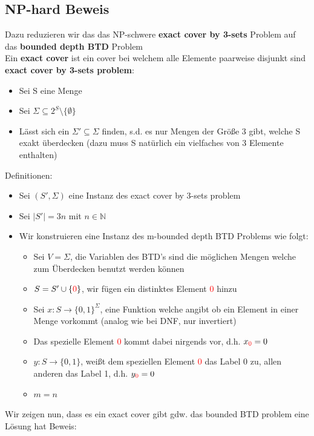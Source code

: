 \documentclass[12pt,a4paper]{article}
\newcommand{\nl}{\\[0.1cm]}
\newcommand{\red}[1]{\textcolor{red} {#1}}
\begin{document}
\subsection{NP-hard Beweis}
Dazu reduzieren wir das das NP-schwere \textbf{exact cover by 3-sets} Problem auf das \textbf{bounded depth BTD} Problem\nl
Ein \textbf{exact cover} ist ein cover bei welchem alle Elemente paarweise disjunkt sind\nl
\textbf{exact cover by 3-sets problem}:
\begin{itemize}
\item Sei S eine Menge
\item Sei $\Sigma \subseteq 2^S \setminus \{\emptyset\}$
\item Lässt sich ein $\Sigma' \subseteq \Sigma$ finden, s.d. es nur Mengen der Größe 3 gibt, welche S exakt überdecken (dazu muss S natürlich ein vielfaches von 3 Elemente enthalten)
\end{itemize}
Definitionen:
\begin{itemize}
\item Sei $(S',\Sigma)$ eine Instanz des exact cover by 3-sets problem
\item Sei $|S'| = 3n$ mit $n\in\mathbb{N}$
\item Wir konstruieren eine Instanz des m-bounded depth BTD Problems wie folgt:
\begin{itemize}
\item Sei $V=\Sigma$, die Variablen des BTD's sind die möglichen Mengen welche zum Überdecken benutzt werden können
\item $S=S'\cup\{\red{0}\}$, wir fügen ein distinktes Element \red{0} hinzu
\item Sei $x:S\rightarrow \{0,1\}^\Sigma$, eine Funktion welche angibt ob ein Element in einer Menge vorkommt (analog wie bei DNF, nur invertiert)
\item Das spezielle Element \red{0} kommt dabei nirgends vor, d.h. $x_{\red{0}} = 0$
\item $y:S\rightarrow \{0,1\}$, weißt dem speziellen Element \red{0} das Label 0 zu, allen anderen das Label 1, d.h. $y_{\red{0}} = 0$
\item $m=n$
\end{itemize}
\end{itemize}
Wir zeigen nun, dass es ein exact cover gibt gdw. das bounded BTD problem eine Lösung hat
Beweis:
\end{document}

